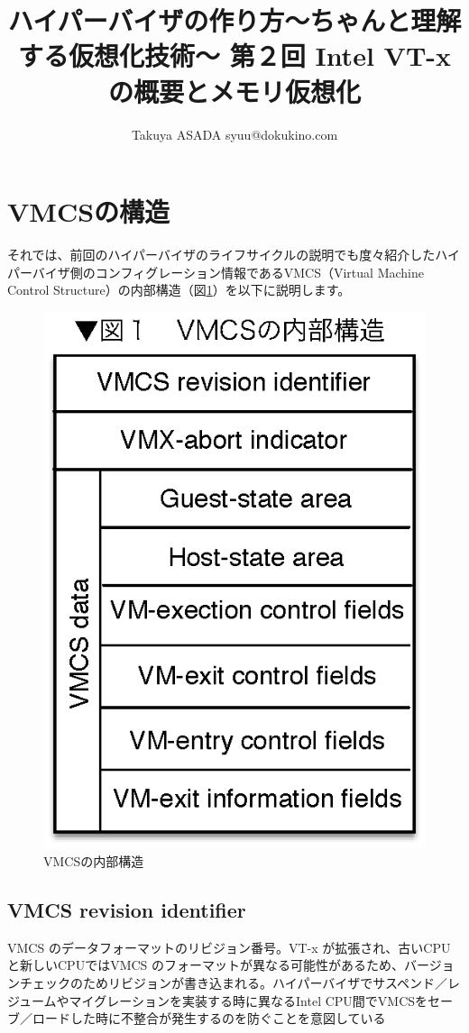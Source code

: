 \documentclass[a4j,12pt]{jarticle}
\title{ハイパーバイザの作り方～ちゃんと理解する仮想化技術～ 第２回 Intel VT-xの概要とメモリ仮想化}
\author{Takuya ASADA syuu@dokukino.com}
\begin{document}
\maketitle

\section{VMCSの構造}
それでは、前回のハイパーバイザのライフサイクルの説明でも度々紹介したハイパーバイザ側のコンフィグレーション情報であるVMCS（Virtual Machine Control Structure）の内部構造（図\ref{fig1}）を以下に説明します。

\begin{figure}
\includegraphics{figures/part2_fig1.eps}
\caption{VMCSの内部構造}
\label{fig1}
\end{figure}

\subsection*{VMCS revision identifier}
VMCS のデータフォーマットのリビジョン番号。VT-x が拡張され、古いCPUと新しいCPUではVMCS のフォーマットが異なる可能性があるため、バージョンチェックのためリビジョンが書き込まれる。ハイパーバイザでサスペンド／レジュームやマイグレーションを実装する時に異なるIntel CPU間でVMCSをセーブ／ロードした時に不整合が発生するのを防ぐことを意図している
\end{document}

